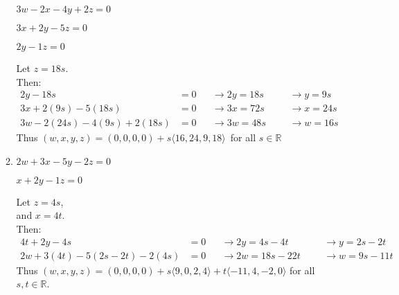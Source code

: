 \documentclass{letter}
\newcommand{\Ve}[1]{\langle #1 \rangle}
\newcommand\Que[1]{%
   \leavevmode\noindent
   #1
}
\newcommand\Ans[2][]{%
   \leavevmode\noindent
   {
       \begin{mdframed}[backgroundcolor=blue!10]
       #2
       \end{mdframed}
   }
}
\begin{document}
\begin{enumerate}
\begin{enumerate}[label=(\alph*)]
{        \begin{minipage}[t]{0.25\textwidth}
        \begin{flushright}
        $3w-2x-4y+2z=0$\par $3x+2y-5z=0$\par $2y-1z=0$ 
        \end{flushright}
        \end{minipage}
        }
    \Ans{
    Let $z=18s$. \\
    Then: 
    \begin{align*}
    2y - 18s &= 0 &&\rightarrow 2y = 18s &&&\rightarrow y = 9s \\
    3x +2(9s) - 5(18s) &= 0 &&\rightarrow  3x = 72s &&&\rightarrow x = 24s\\
    3w-2(24s)-4(9s)+2(18s) &=0 &&\rightarrow 3w = 48s &&&\rightarrow w = 16s   
    \end{align*} 
    Thus $(w,x,y,z) = (0,0,0,0) + s\Ve{16,24,9,18}$\ for all $s \in \mathbb{R}$
    }
    \item \Que{
        \begin{minipage}[t]{0.25\textwidth}
        \begin{flushright}
        $2w+3x-5y-2z=0$\par $x+2y-1z=0$
        \end{flushright}
        \end{minipage}
        }
    \Ans{
    Let $z=4s$, \\ and $x=4t$. \\ Then:
    \begin{align*}
      4t+2y-4s&=0 &&\rightarrow 2y=4s-4t &&&\rightarrow y=2s-2t \\
      2w+3(4t)-5(2s-2t)-2(4s)&=0 &&\rightarrow 2w=18s-22t &&&\rightarrow w=9s-11t 
    \end{align*} 
    Thus $(w,x,y,z) = (0,0,0,0) + s\Ve{9,0,2,4} + t\Ve{-11,4,-2,0}$ for all $s,t \in \mathbb{R}$.
    }
    \end{enumerate}
\end{enumerate} 
\end{document}
